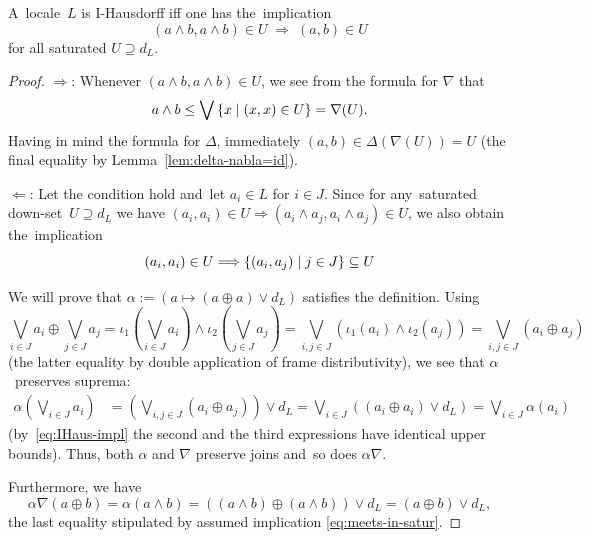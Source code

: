 \begin{prop} \label{meets-in-satur}
  A~locale~$L$ is I-Hausdorff iff one has the~implication
  \begin{equation} \label{eq:meets-in-satur}
    \left( a \wedge b, a \wedge b \right) \in U
    \; \Rightarrow \;
    \left( a, b \right) \in U
  \end{equation}
  for all saturated $U \supseteq d_L$.
\end{prop}
\begin{proof}
  $\Rightarrow$:
  Whenever $(a \wedge b, a \wedge b)\in U$, we see from the formula for
  $\nabla$ that
  \[
    a \wedge b \leq \bigvee \left\{ x \mid (x, x) \in U \right\} = \nabla(U).
  \]
  Having in mind the formula for $\Delta$, immediately $(a, b) \in \Delta(
  \nabla(U) ) = U$
  (the final equality by Lemma~\ref{lem:delta-nabla=id}).

  $\Leftarrow$:
  Let the condition hold and~let $a_i\in L$ for $i\in J$. 
  Since for any~saturated down-set~$U \supseteq d_L$ we have $(a_i, a_i) \in U
  \Rightarrow (a_i \wedge a_j, a_i \wedge a_j) \in U$, we also obtain
  the~implication
  \begin{equation} \label{eq:IHaus-impl}
    (a_i, a_i) \in U \Longrightarrow \{ (a_i, a_j) \mid j\in J \} \subseteq U
  \end{equation}

  We will prove that $\alpha := (a \mapsto (a \oplus a) \vee d_L)$ satisfies
  the definition.
  Using
  \[
    \bigvee_{i\in J} a_i \oplus \bigvee_{j\in J} a_j
    = \iota_1 \left( \bigvee_{i\in J} a_i \right) \wedge \iota_2 \left(
    \bigvee_{j\in J} a_j \right)
    = \bigvee_{i, j\in J} \left( \iota_1(a_i) \wedge \iota_2(a_j) \right)
    = \bigvee_{i, j\in J} \left( a_i \oplus a_j \right)
  \]
  (the latter equality by double application of frame distributivity), we see
  that $\alpha$~preserves suprema:
  \begin{align*}
    \alpha \left( \bigvee_{i\in J} a_i \right)
    &= \left(\bigvee_{i, j\in J} \left( a_i \oplus a_j \right)\right) \vee d_L
    = \bigvee_{i\in J} \left(\left( a_i \oplus a_i \right) \vee d_L \right)
    = \bigvee_{i\in J} \alpha \left( a_i \right)
  \end{align*}
  (by~\eqref{eq:IHaus-impl} the second and the third expressions have identical
  upper bounds).
  Thus, both $\alpha$ and $\nabla$ preserve joins and~so does $\alpha \nabla$. 

  Furthermore, we have
  \[
    \alpha \nabla (a \oplus b)
    = \alpha (a \wedge b)
    = ((a \wedge b) \oplus (a \wedge b)) \vee d_L
    = (a \oplus b) \vee d_L,
  \]
  the last equality stipulated by assumed implication
  \eqref{eq:meets-in-satur}.


\end{proof}

